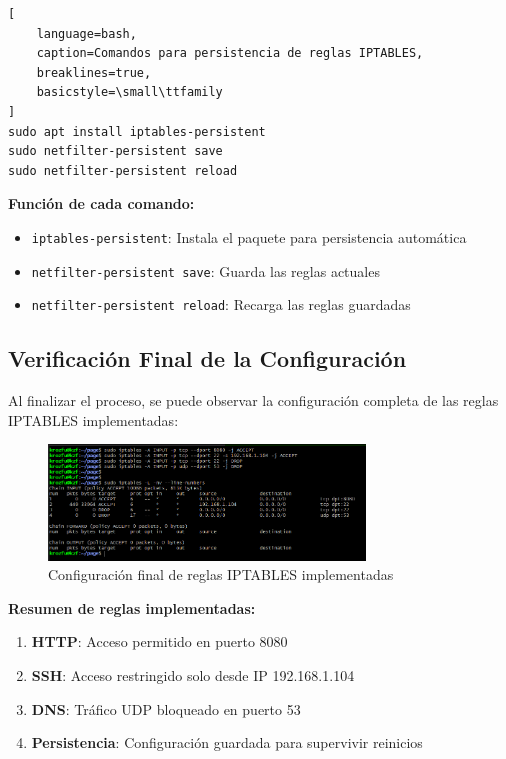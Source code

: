 \documentclass[12pt,a4paper]{article}
\begin{document}
\begin{lstlisting}[
    language=bash, 
    caption=Comandos para persistencia de reglas IPTABLES,
    breaklines=true,
    basicstyle=\small\ttfamily
]
sudo apt install iptables-persistent
sudo netfilter-persistent save
sudo netfilter-persistent reload
\end{lstlisting}

\textbf{Función de cada comando:}
\begin{itemize}
  \item \texttt{iptables-persistent}: Instala el paquete para persistencia automática
  \item \texttt{netfilter-persistent save}: Guarda las reglas actuales
  \item \texttt{netfilter-persistent reload}: Recarga las reglas guardadas
\end{itemize}

\subsection{Verificación Final de la Configuración}

Al finalizar el proceso, se puede observar la configuración completa de las
reglas IPTABLES implementadas:

\begin{figure}[H]
  \centering
  \includegraphics[width=0.75\textwidth]{./assets/img11.png}
  \caption{Configuración final de reglas IPTABLES implementadas}
  \label{fig:iptables-final}
\end{figure}

\textbf{Resumen de reglas implementadas:}

\begin{enumerate}
  \item \textbf{HTTP}: Acceso permitido en puerto 8080
  \item \textbf{SSH}: Acceso restringido solo desde IP 192.168.1.104
  \item \textbf{DNS}: Tráfico UDP bloqueado en puerto 53
  \item \textbf{Persistencia}: Configuración guardada para supervivir reinicios
\end{enumerate}
\end{document}
